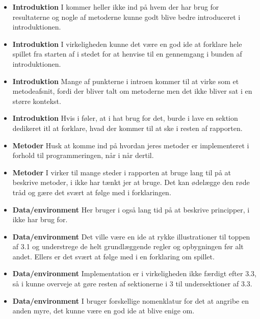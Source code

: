 \documentclass[11pt, fleqn, titlepage]{article}
\begin{document}
\begin{itemize}
		\item \textbf{Introduktion} I kommer heller ikke ind på hvem der har brug for resultaterne og nogle af metoderne kunne godt blive bedre introduceret i introduktionen.
		
		\item \textbf{Introduktion} I virkeligheden kunne det være en god ide at forklare hele spillet fra starten af i stedet for at henvise til en gennemgang i bunden af introduktionen.
		
		\item \textbf{Introduktion} Mange af punkterne i introen kommer til at virke som et metodeafsnit, fordi der bliver talt om metoderne men det ikke bliver sat i en større kontekst.
		
		\item \textbf{Introduktion} Hvis i føler, at i hat brug for det, burde i lave en sektion dedikeret itl at forklare, hvad der kommer til at ske i resten af rapporten.
		
		\item \textbf{Metoder} Husk at komme ind på hvordan jeres metoder er implementeret i forhold til programmeringen, når i når dertil.
		
		\item \textbf{Metoder} I virker til mange steder i rapporten at bruge lang til på at beskrive metoder, i ikke har tænkt jer at bruge. Det kan ødelægge den røde tråd og gære det svært at følge med i forklaringen.
		
		\item \textbf{Data/environment} Her bruger i også lang tid på at beskrive principper, i ikke har brug for.
		
		\item \textbf{Data/environment} Det ville være en ide at rykke illustrationer til toppen af 3.1 og understrege de helt grundlæggende regler og opbygningen før alt andet. Ellers er det svært at følge med i en forklaring om spillet.
		
		\item \textbf{Data/environment} Implementation er i virkeligheden ikke færdigt efter 3.3, så i kunne overveje at gøre resten af sektionerne i 3 til undersektioner af 3.3.
		
		\item \textbf{Data/environment} I bruger forskellige nomenklatur for det at angribe en anden myre, det kunne være en god ide at blive enige om.
		
	\end{itemize}
	
	
\end{document}
